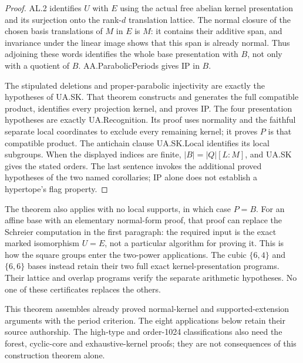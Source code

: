 \begin{proof}
AL.2 identifies $U$ with $E$ using the actual free abelian kernel
presentation and its surjection onto the rank-$d$ translation lattice.
The normal closure of the chosen basis translations of $M$ in $E$ is
$M$: it contains their additive span, and invariance under the linear
image shows that this span is already normal. Thus adjoining these words
identifies the whole base presentation with $B$, not only with a quotient
of $B$. AA.ParabolicPeriods gives IP in $B$.

The stipulated deletions and proper-parabolic injectivity are exactly the
hypotheses of UA.SK. That theorem constructs and generates the full
compatible product, identifies every projection kernel, and proves IP.
The four presentation hypotheses are exactly UA.Recognition. Its proof uses
normality and the faithful separate local coordinates to exclude every
remaining kernel; it proves $P$ is that compatible product. The antichain
clause UA.SK.Local identifies its local subgroups. When the displayed
indices are finite, $|B|=|Q|[L:M]$, and UA.SK gives the stated orders.
The last sentence invokes the additional proved hypotheses of the two
named corollaries; IP alone does not establish a hypertope's flag property.
\end{proof}

The theorem also applies with no local supports, in which case $P=B$.
For an affine base with an elementary normal-form proof, that proof can
replace the Schreier computation in the first paragraph: the required input
is the exact marked isomorphism $U=E$, not a particular algorithm for proving
it. This is how the square groups enter the two-power applications. The
cubic $\{6,4\}$ and $\{6,6\}$ bases instead retain their two full exact
kernel-presentation programs. Their lattice and overlap programs verify the
separate arithmetic hypotheses. No one of these certificates replaces the
others.

This theorem assembles already proved normal-kernel and supported-extension
arguments with the period criterion. The eight applications below retain
their source authorship. The high-type and order-1024 classifications also
need the forest, cyclic-core and exhaustive-kernel proofs; they are not
consequences of this construction theorem alone.
